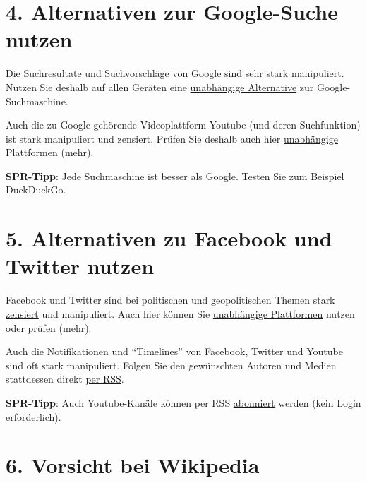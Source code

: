 \hypertarget{4-alternativen-zur-google-suche-nutzen}{%
\section{4. Alternativen zur Google-Suche
nutzen}\label{4-alternativen-zur-google-suche-nutzen}}

Die Suchresultate und Suchvorschläge von Google sind sehr stark
\href{https://www.youtube.com/watch?v=TSN6LE06J54}{manipuliert}. Nutzen
Sie deshalb auf allen Geräten eine
\href{https://fossbytes.com/google-alternative-best-search-engine/}{unabhängige
Alternative} zur Google-Suchmaschine.

Auch die zu Google gehörende Videoplattform Youtube (und deren
Suchfunktion) ist stark manipuliert und zensiert. Prüfen Sie deshalb
auch hier
\href{https://reclaimthenet.org/best-youtube-alternatives/}{unabhängige
Plattformen}
(\href{https://fossbytes.com/best-free-youtube-alternative-sites/}{mehr}).

\textbf{SPR-Tipp}: Jede Suchmaschine ist besser als Google. Testen Sie
zum Beispiel DuckDuckGo.

\hypertarget{5-alternativen-zu-facebook-und-twitter-nutzen}{%
\section{5. Alternativen zu Facebook und Twitter
nutzen}\label{5-alternativen-zu-facebook-und-twitter-nutzen}}

Facebook und Twitter sind bei politischen und geopolitischen Themen
stark
\href{https://reclaimthenet.org/twitter-panel-blacklist-search-trends/}{zensiert}
und manipuliert. Auch hier können Sie
\href{https://reclaimthenet.org/facebook-twitter-alternatives-free-speech/}{unabhängige
Plattformen} nutzen oder prüfen
(\href{https://makeawebsitehub.com/facebook-alternatives/}{mehr}).

Auch die Notifikationen und ``Timelines'' von Facebook, Twitter und
Youtube sind oft stark manipuliert. Folgen Sie den gewünschten Autoren
und Medien stattdessen direkt
\href{https://www.lifewire.com/top-free-online-rss-readers-3486649}{per
RSS}.

\textbf{SPR-Tipp}: Auch Youtube-Kanäle können per RSS
\href{https://danielmiessler.com/blog/rss-feed-youtube-channel/}{abonniert}
werden (kein Login erforderlich).

\hypertarget{6-vorsicht-bei-wikipedia}{%
\section{6. Vorsicht bei Wikipedia}\label{6-vorsicht-bei-wikipedia}}

